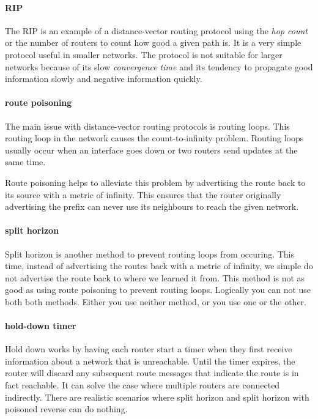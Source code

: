 \paragraph{\acf{RIP}}
The \acl{RIP} is an example of a distance-vector routing protocol using the \emph{hop count} or the number of routers to count how good a given path is.%
It is a very simple protocol useful in smaller networks.
The protocol is not suitable for larger networks because of its slow \emph{convergence time} and its tendency to propagate good information slowly and negative information quickly.

\paragraph{route poisoning}
The main issue with distance-vector routing protocols is routing loops.%
This routing loop in the network causes the count-to-infinity problem.%
Routing loops usually occur when an interface goes down or two routers send updates at the same time.

Route poisoning helps to alleviate this problem by advertising the route back to its source with a metric of infinity.
This ensures that the router originally advertising the prefix can never use its neighbours to reach the given network.

\paragraph{split horizon}
Split horizon is another method to prevent routing loops from occuring.%
This time, instead of advertising the routes back with a metric of infinity, we simple do not advertise the route back to where we learned it from.
This method is not as good as using route poisoning to prevent routing loops.
Logically you can not use both both methods. Either you use neither method, or you use one or the other.

\paragraph{hold-down timer}
Hold down works by having each router start a timer when they first receive information about a network that is unreachable.
Until the timer expires, the router will discard any subsequent route messages that indicate the route is in fact reachable.
It can solve the case where multiple routers are connected indirectly.
There are realistic scenarios where split horizon and split horizon with poisoned reverse can do nothing.

